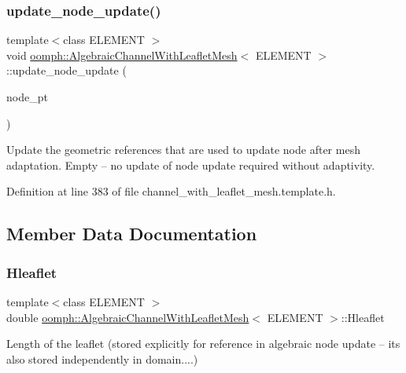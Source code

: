 \subsubsection{\texorpdfstring{update\+\_\+node\+\_\+update()}{update\_node\_update()}}
{\footnotesize\ttfamily template$<$class E\+L\+E\+M\+E\+NT $>$ \\
void \hyperlink{classoomph_1_1AlgebraicChannelWithLeafletMesh}{oomph\+::\+Algebraic\+Channel\+With\+Leaflet\+Mesh}$<$ E\+L\+E\+M\+E\+NT $>$\+::update\+\_\+node\+\_\+update (\begin{DoxyParamCaption}\item[{Algebraic\+Node $\ast$\&}]{node\+\_\+pt }\end{DoxyParamCaption})\hspace{0.3cm}{\ttfamily [inline]}}



Update the geometric references that are used to update node after mesh adaptation. Empty -- no update of node update required without adaptivity. 



Definition at line 383 of file channel\+\_\+with\+\_\+leaflet\+\_\+mesh.\+template.\+h.



\subsection{Member Data Documentation}
\mbox{\label{classoomph_1_1AlgebraicChannelWithLeafletMesh_a22e6274b52941ae60cbe66287dd02fb4}} 
\subsubsection{\texorpdfstring{Hleaflet}{Hleaflet}}
{\footnotesize\ttfamily template$<$class E\+L\+E\+M\+E\+NT $>$ \\
double \hyperlink{classoomph_1_1AlgebraicChannelWithLeafletMesh}{oomph\+::\+Algebraic\+Channel\+With\+Leaflet\+Mesh}$<$ E\+L\+E\+M\+E\+NT $>$\+::Hleaflet\hspace{0.3cm}{\ttfamily [protected]}}

Length of the leaflet (stored explicitly for reference in algebraic node update -- it\textquotesingle{}s also stored independently in domain....) 

